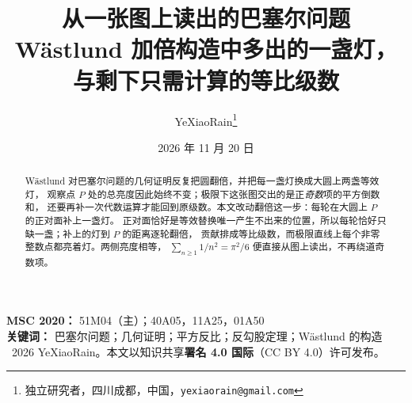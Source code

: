 \documentclass[11pt,a4paper]{article}
\title{\textbf{从一张图上读出的巴塞尔问题}\\[0.3em]
\large Wästlund 加倍构造中多出的一盏灯，与剩下只需计算的等比级数}
\author{YeXiaoRain\thanks{独立研究者，四川成都，中国，\texttt{yexiaorain@gmail.com}}}
\date{2026 年 11 月 20 日}
\theoremstyle{definition}
\begin{document}
\maketitle

\begin{abstract}
Wästlund 对巴塞尔问题的几何证明反复把圆翻倍，并把每一盏灯换成大圆上两盏等效灯，
观察点 $P$ 处的总亮度因此始终不变；极限下这张图交出的是正\emph{奇数}项的平方倒数和，
还要再补一次代数运算才能回到原级数。本文改动翻倍这一步：每轮在大圆上 $P$ 的正对面补上一盏灯。
正对面恰好是等效替换唯一产生不出来的位置，所以每轮恰好只缺一盏；补上的灯到 $P$ 的距离逐轮翻倍，
贡献排成等比级数，而极限直线上每个非零整数点都亮着灯。两侧亮度相等，
$\sum_{n\ge1}1/n^{2}=\pi^{2}/6$ 便直接从图上读出，不再绕道奇数项。
\end{abstract}

\begin{center}
\small
\textbf{MSC 2020：} 51M04（主）；40A05，11A25，01A50\\[0.3em]
\textbf{关键词：} 巴塞尔问题；几何证明；平方反比；反勾股定理；Wästlund 的构造\\[0.5em]
\textcopyright\ 2026 YeXiaoRain。本文以知识共享\textbf{署名 4.0 国际}（CC BY 4.0）许可发布。
\end{center}





\end{document}
